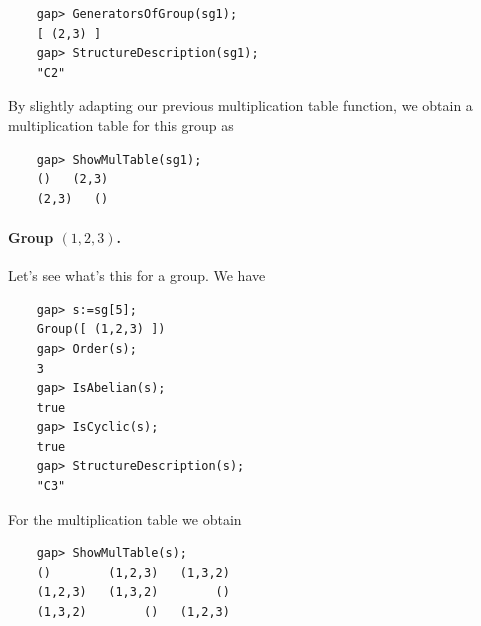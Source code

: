 \begin{verbatim}
    gap> GeneratorsOfGroup(sg1);
    [ (2,3) ]
    gap> StructureDescription(sg1);
    "C2"
\end{verbatim}

By slightly adapting our previous multiplication table function, we obtain a multiplication table for this group as

\begin{verbatim}
    gap> ShowMulTable(sg1);
    ()   (2,3)   
    (2,3)   ()   
\end{verbatim}

\paragraph{Group $(1,2,3)$.} Let's see what's this for a group. We have

\begin{verbatim}
    gap> s:=sg[5];
    Group([ (1,2,3) ])
    gap> Order(s);
    3
    gap> IsAbelian(s);
    true
    gap> IsCyclic(s);
    true
    gap> StructureDescription(s);
    "C3"
\end{verbatim}

For the multiplication table we obtain

\begin{verbatim}
    gap> ShowMulTable(s);
    ()        (1,2,3)   (1,3,2)   
    (1,2,3)   (1,3,2)        ()   
    (1,3,2)        ()   (1,2,3)   
\end{verbatim}


